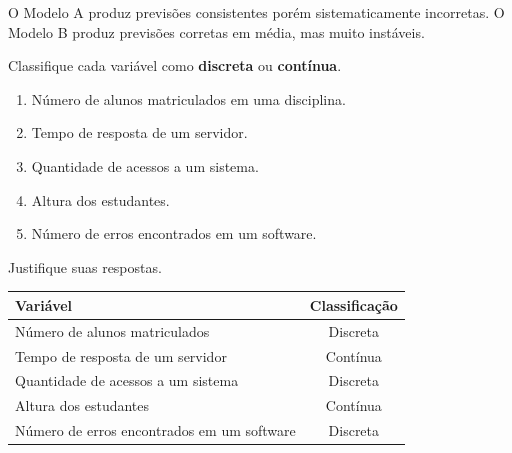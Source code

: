 \documentclass[a4paper,12pt,addpoints]{exam}
\begin{document}
\begin{questions}
		\begin{solution}
			
			O Modelo A produz previsões consistentes porém sistematicamente incorretas. O Modelo B produz previsões corretas em média, mas muito instáveis.
		\end{solution}
		
		\question[1]
		
		Classifique cada variável como \textbf{discreta} ou \textbf{contínua}.
		
		\begin{enumerate}
			\item Número de alunos matriculados em uma disciplina.
			\item Tempo de resposta de um servidor.
			\item Quantidade de acessos a um sistema.
			\item Altura dos estudantes.
			\item Número de erros encontrados em um software.
		\end{enumerate}
		
		Justifique suas respostas.
		
		\begin{solution}
			\begin{center}
				\begin{tabular}{|l|c|}
					\hline
					Variável & Classificação \\
					\hline
					Número de alunos matriculados & Discreta \\
					Tempo de resposta de um servidor & Contínua \\
					Quantidade de acessos a um sistema & Discreta \\
					Altura dos estudantes & Contínua \\
					Número de erros encontrados em um software & Discreta \\
					\hline
				\end{tabular}
			\end{center}
			

\end{solution}
\end{questions}
\end{document}
